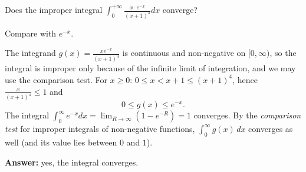 
\begin{question}
Does the improper integral $\displaystyle\int_0^{+\infty}\frac{x\cdot e^{-x}}{(x+1)^4}dx$ converge?
\end{question}

\begin{hint}
Compare with $e^{-x}$.
\end{hint}

\begin{solution}
The integrand $g(x)=\frac{xe^{-x}}{(x+1)^4}$ is continuous and non-negative on $[0,\infty)$, so the integral is improper only because of the infinite limit of integration, and we may use the comparison test.
For $x\ge0$: $0\le x<x+1\le(x+1)^4$, hence $\frac{x}{(x+1)^4}\le1$ and
\[
0\le g(x)\le e^{-x}.
\]
The integral $\int_0^\infty e^{-x}dx=\lim_{R\to\infty}\left(1-e^{-R}\right)=1$ converges. By the \emph{comparison test} for improper integrals of non-negative functions, $\int_0^\infty g(x)\,dx$ converges as well (and its value lies between $0$ and $1$).

\textbf{Answer:} yes, the integral converges.
\end{solution}
